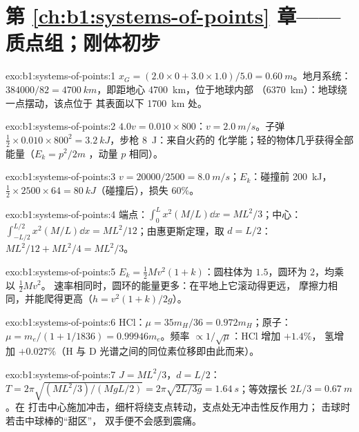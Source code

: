 \section*{第 \ref{ch:b1:systems-of-points} 章——质点组；刚体初步}

\begin{solution}{exo:b1:systems-of-points:1}
$x_G = (2.0 \times 0 + 3.0 \times 1.0)/5.0 = \qty{0.60}{m}$。地月系统：
$384000/82 = \qty{4700}{km}$，即距地心 \qty{4700}{km}，位于地球内部
（\qty{6370}{km}）：地球绕一点摆动，该点位于
其表面以下 \qty{1700}{km} 处。
\end{solution}

\begin{solution}{exo:b1:systems-of-points:2}
$4.0v = 0.010 \times 800$：$v = \qty{2.0}{m/s}$。子弹 $\tfrac12 \times 0.010
\times 800^2 = \qty{3.2}{kJ}$，步枪 \qty{8}{J}：来自火药的
化学能；轻的物体几乎获得全部能量（$E_k = p^2/2m$
，动量 $p$ 相同）。
\end{solution}

\begin{solution}{exo:b1:systems-of-points:3}
$v = 20000/2500 = \qty{8.0}{m/s}$；$E_k$：碰撞前 \qty{200}{kJ}，$\tfrac12 \times
2500 \times 64 = \qty{80}{kJ}$（碰撞后），损失 $60\%$。
\end{solution}

\begin{solution}{exo:b1:systems-of-points:4}
端点：$\int_0^L x^2(M/L)\dd x = ML^2/3$；中心：$\int_{-L/2}^{L/2}x^2(M/L)
\dd x = ML^2/12$；由惠更斯定理，取 $d = L/2$：$ML^2/12 + ML^2/4 = ML^2/3$。
\end{solution}

\begin{solution}{exo:b1:systems-of-points:5}
$E_k = \tfrac12 Mv^2(1 + k)$：圆柱体为 $1.5$，圆环为 $2$，均乘以 $\tfrac12 Mv^2$。
速率相同时，圆环的能量更多：在平地上它滚动得更远，
摩擦力相同，并能爬得更高（$h = v^2(1 + k)/2g$）。
\end{solution}

\begin{solution}{exo:b1:systems-of-points:6}
HCl：$\mu = 35m_H/36 = 0.972m_H$；原子：$\mu = m_e/(1 + 1/1836) =
0.99946m_e$。频率 $\propto 1/\sqrt\mu$：HCl 增加 $+1.4\%$，
氢增加 $+0.027\%$（H 与 D 光谱之间的同位素位移即由此而来）。
\end{solution}

\begin{solution}{exo:b1:systems-of-points:7}
$J = ML^2/3$，$d = L/2$：$T = 2\pi\sqrt{(ML^2/3)/(MgL/2)} = 2\pi\sqrt{2L/3g}
= \qty{1.64}{s}$；等效摆长 $2L/3 = \qty{0.67}{m}$。在
打击中心施加冲击，细杆将绕支点转动，支点处无冲击性反作用力；
击球时若击中球棒的“甜区”，
双手便不会感到震痛。
\end{solution}

